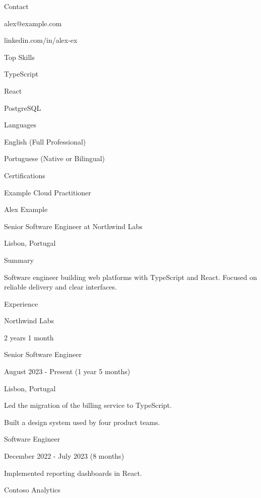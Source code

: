 \documentclass[11pt]{article}
\begin{document}
\begin{minipage}[t]{0.34\textwidth}
{\large Contact}\par
alex@example.com\par
linkedin.com/in/alex-ex\par
\vspace{8pt}
{\large Top Skills}\par
TypeScript\par
React\par
PostgreSQL\par
\vspace{8pt}
{\large Languages}\par
English (Full Professional)\par
Portuguese (Native or Bilingual)\par
\vspace{8pt}
{\large Certifications}\par
Example Cloud Practitioner\par
\end{minipage}\hfill
\begin{minipage}[t]{0.60\textwidth}
{\LARGE Alex Example}\par
Senior Software Engineer at Northwind Labs\par
Lisbon, Portugal\par
\vspace{8pt}
{\large Summary}\par
Software engineer building web platforms with TypeScript and React.
Focused on reliable delivery and clear interfaces.\par
\vspace{8pt}
{\large Experience}\par
{\large Northwind Labs}\par
2 years 1 month\par
Senior Software Engineer\par
August 2023 - Present (1 year 5 months)\par
Lisbon, Portugal\par
Led the migration of the billing service to TypeScript.\par
Built a design system used by four product teams.\par
Software Engineer\par
December 2022 - July 2023 (8 months)\par
Implemented reporting dashboards in React.\par
\end{minipage}
\newpage
{\large Contoso Analytics}\par
\end{document}
